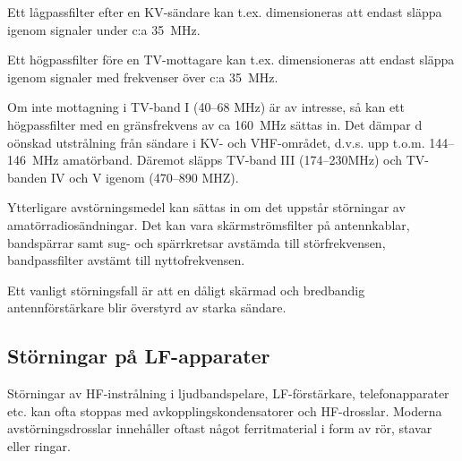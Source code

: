Ett lågpassfilter efter en KV-sändare kan t.ex. dimensioneras att endast släppa
igenom signaler under c:a 35~MHz.

Ett högpassfilter före en TV-mottagare kan t.ex. dimensioneras att endast släppa
igenom signaler med frekvenser över c:a 35~MHz.

Om inte mottagning i TV-band I (40--68 MHz) är av intresse, så kan ett
högpassfilter med en gränsfrekvens av ca 160~MHz sättas in. Det dämpar d
oönskad utstrålning från sändare i KV- och VHF-området, d.v.s. upp
t.o.m. 144--146~MHz amatörband. Däremot släpps TV-band III (174--230MHz) och
TV-banden IV och V igenom (470--890 MHZ).

Ytterligare avstörningsmedel kan sättas in om det uppstår störningar av
amatörradiosändningar. Det kan vara skärmströmsfilter på antennkablar,
bandspärrar samt sug- och spärrkretsar avstämda till störfrekvensen,
bandpassfilter avstämt till nyttofrekvensen.

Ett vanligt störningsfall är att en dåligt skärmad och bredbandig
antennförstärkare blir överstyrd av starka sändare.

\subsection{Störningar på LF-apparater}

Störningar av HF-instrålning i ljudbandspelare, LF-förstärkare,
telefonapparater etc. kan ofta stoppas med avkopplingskondensatorer
och HF-drosslar. Moderna avstörningsdrosslar innehåller oftast något
ferritmaterial i form av rör, stavar eller ringar.

